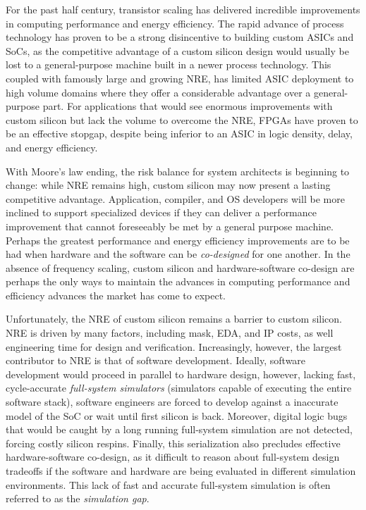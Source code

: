 For the past half century, transistor scaling has delivered incredible
improvements in computing performance and energy efficiency. The rapid advance
of process technology has proven to be a strong disincentive to building custom ASICs and SoCs, 
as the competitive advantage of a custom silicon design would usually be lost
to a general-purpose machine built in a newer process technology. This coupled
with famously large and growing NRE, has limited ASIC deployment to high volume
domains where they offer a considerable advantage over a general-purpose part.
For applications that would see enormous improvements with custom silicon but
lack the volume to overcome the NRE, FPGAs have proven to be an effective
stopgap, despite being inferior to an ASIC in logic density, delay, and energy
efficiency.

With Moore’s law ending, the risk balance for system architects is beginning to
change: while NRE remains high, custom silicon may now present a lasting
competitive advantage.  Application, compiler, and OS developers will be more
inclined to support specialized devices if they can deliver a performance
improvement that cannot foreseeably be met by a general purpose machine.
Perhaps the greatest performance and energy efficiency improvements are to be
had when hardware and the software can be \emph{co-designed} for one another.
In the absence of frequency scaling, custom silicon and hardware-software
co-design are perhaps the only ways to maintain the advances in computing
performance and efficiency advances the market has come to expect.

Unfortunately, the NRE of custom silicon remains a barrier to custom silicon.
NRE is driven by many factors, including mask, EDA, and IP costs, as well
engineering time for design and verification. Increasingly, however, the
largest contributor to NRE is that of software development.  Ideally, software
development would proceed in parallel to hardware design, however, lacking
fast, cycle-accurate \emph{full-system simulators} (simulators capable of
executing the entire software stack), software engineers are forced to develop
against a inaccurate model of the SoC or wait until first silicon is back.
Moreover, digital logic bugs that would be caught by a long running full-system
simulation are not detected, forcing costly silicon respins.  Finally, this
serialization also precludes effective hardware-software co-design, as it
difficult to reason about full-system design tradeoffs if the software and
hardware are being evaluated in different simulation environments. This lack of
fast and accurate full-system simulation is often referred to as the
\emph{simulation gap}.

